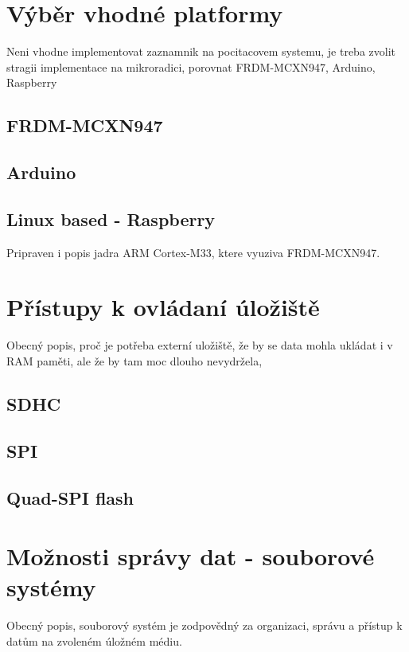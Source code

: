 \section{Výběr vhodné platformy}
Neni vhodne implementovat zaznamnik na pocitacovem systemu, je treba zvolit stragii implementace na mikroradici, porovnat FRDM-MCXN947, Arduino, Raspberry
\subsection{FRDM-MCXN947}

\subsection{Arduino}

\subsection{Linux based - Raspberry}

Pripraven i popis jadra ARM Cortex-M33, ktere vyuziva FRDM-MCXN947.

\section{Přístupy k ovládaní úložiště}
Obecný popis, proč je potřeba externí uložiště, že by se data mohla ukládat i v RAM paměti, ale že by tam moc dlouho nevydržela, 

\subsection{SDHC}

\subsection{SPI}
\subsection{Quad-SPI flash}


\section{Možnosti správy dat - souborové systémy} 
Obecný popis, souborový systém je zodpovědný za organizaci, správu a přístup k datům na zvoleném úložném médiu.

